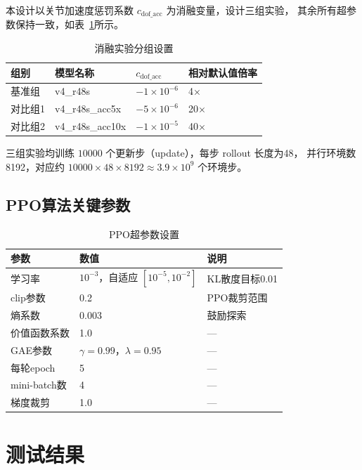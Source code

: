 \documentclass[12pt, a4paper]{article}
\begin{document}
本设计以关节加速度惩罚系数 $c_\text{dof\_acc}$ 为消融变量，设计三组实验，
其余所有超参数保持一致，如表~\ref{tab:ablation}所示。

\begin{table}[H]
\centering
\caption{消融实验分组设置}
\label{tab:ablation}
\begin{tabular}{llll}
\toprule
组别 & 模型名称 & $c_\text{dof\_acc}$ & 相对默认值倍率 \\
\midrule
基准组 & v4\_r48s & $-1 \times 10^{-6}$ & 4× \\
对比组1 & v4\_r48s\_acc5x & $-5 \times 10^{-6}$ & 20× \\
对比组2 & v4\_r48s\_acc10x & $-1 \times 10^{-5}$ & 40× \\
\bottomrule
\end{tabular}
\end{table}

三组实验均训练 $10000$ 个更新步（update），每步 rollout 长度为48，
并行环境数8192，对应约 $10000 \times 48 \times 8192 \approx 3.9 \times 10^9$ 个环境步。

\subsection{PPO算法关键参数}

\begin{table}[H]
\centering
\caption{PPO超参数设置}
\label{tab:ppo}
\begin{tabular}{lll}
\toprule
参数 & 数值 & 说明 \\
\midrule
学习率 & $10^{-3}$，自适应 $[10^{-5}, 10^{-2}]$ & KL散度目标0.01 \\
clip参数 & 0.2 & PPO裁剪范围 \\
熵系数 & 0.003 & 鼓励探索 \\
价值函数系数 & 1.0 & — \\
GAE参数 & $\gamma=0.99$，$\lambda=0.95$ & — \\
每轮epoch & 5 & — \\
mini-batch数 & 4 & — \\
梯度裁剪 & 1.0 & — \\
\bottomrule
\end{tabular}
\end{table}


\section{测试结果}
\end{document}
